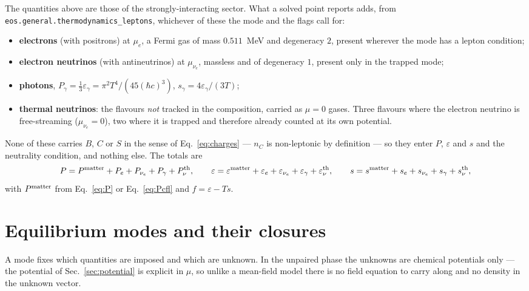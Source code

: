 \documentclass[aps,prc,onecolumn,superscriptaddress,nofootinbib,10pt]{revtex4-2}
\newcommand{\nC}{n_C}
\newcommand{\munue}{\mu_{\nu_e}}
\newcommand{\hc}{(\hbar c)^3}
\begin{document}
The quantities above are those of the strongly-interacting sector. What a
solved point reports adds, from
\texttt{eos.general.thermodynamics\_leptons}, whichever of these the mode and
the flags call for:
%
\begin{itemize}
\item \textbf{electrons} (with positrons) at $\mu_e$, a Fermi gas of mass
      $0.511$~MeV and degeneracy $2$, present wherever the mode has a lepton
      condition;
\item \textbf{electron neutrinos} (with antineutrinos) at $\munue$, massless
      and of degeneracy $1$, present only in the trapped mode;
\item \textbf{photons}, $P_\gamma = \tfrac13\varepsilon_\gamma =
      \pi^2 T^4/(45\hc)$, $s_\gamma = 4\varepsilon_\gamma/(3T)$;
\item \textbf{thermal neutrinos}: the flavours \emph{not} tracked in the
      composition, carried as $\mu = 0$ gases. Three flavours where the
      electron neutrino is free-streaming ($\munue = 0$), two where it is
      trapped and therefore already counted at its own potential.
\end{itemize}
%
None of these carries $B$, $C$ or $S$ in the sense of Eq.~\eqref{eq:charges} ---
$\nC$ is non-leptonic by definition --- so they enter $P$, $\varepsilon$ and
$s$ and the neutrality condition, and nothing else. The totals are
%
\begin{equation}
P = P^{\rm matter} + P_e + P_{\nu_e} + P_\gamma + P_{\nu}^{\rm th} , \qquad
\varepsilon = \varepsilon^{\rm matter} + \varepsilon_e + \varepsilon_{\nu_e}
              + \varepsilon_\gamma + \varepsilon_{\nu}^{\rm th} , \qquad
s = s^{\rm matter} + s_e + s_{\nu_e} + s_\gamma + s_{\nu}^{\rm th} ,
\end{equation}
%
with $P^{\rm matter}$ from Eq.~\eqref{eq:P} or Eq.~\eqref{eq:Pcfl} and
$f = \varepsilon - Ts$.

\section{Equilibrium modes and their closures}
\label{sec:modes}

A mode fixes which quantities are imposed and which are unknown. In the
unpaired phase the unknowns are chemical potentials only --- the potential of
Sec.~\ref{sec:potential} is explicit in $\mu$, so unlike a mean-field model
there is no field equation to carry along and no density in the unknown
vector.
\end{document}
